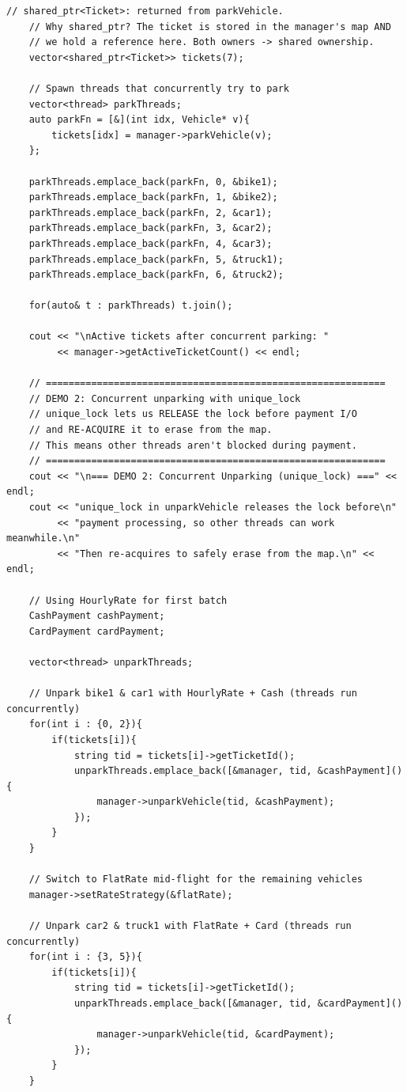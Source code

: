 \documentclass[11pt,a4paper]{article}
\begin{document}
\begin{lstlisting}[title={\texttt{main.cpp}}]
    // shared_ptr<Ticket>: returned from parkVehicle.
    // Why shared_ptr? The ticket is stored in the manager's map AND
    // we hold a reference here. Both owners -> shared ownership.
    vector<shared_ptr<Ticket>> tickets(7);

    // Spawn threads that concurrently try to park
    vector<thread> parkThreads;
    auto parkFn = [&](int idx, Vehicle* v){
        tickets[idx] = manager->parkVehicle(v);
    };

    parkThreads.emplace_back(parkFn, 0, &bike1);
    parkThreads.emplace_back(parkFn, 1, &bike2);
    parkThreads.emplace_back(parkFn, 2, &car1);
    parkThreads.emplace_back(parkFn, 3, &car2);
    parkThreads.emplace_back(parkFn, 4, &car3);
    parkThreads.emplace_back(parkFn, 5, &truck1);
    parkThreads.emplace_back(parkFn, 6, &truck2);

    for(auto& t : parkThreads) t.join();

    cout << "\nActive tickets after concurrent parking: "
         << manager->getActiveTicketCount() << endl;

    // ============================================================
    // DEMO 2: Concurrent unparking with unique_lock
    // unique_lock lets us RELEASE the lock before payment I/O
    // and RE-ACQUIRE it to erase from the map.
    // This means other threads aren't blocked during payment.
    // ============================================================
    cout << "\n=== DEMO 2: Concurrent Unparking (unique_lock) ===" << endl;
    cout << "unique_lock in unparkVehicle releases the lock before\n"
         << "payment processing, so other threads can work meanwhile.\n"
         << "Then re-acquires to safely erase from the map.\n" << endl;

    // Using HourlyRate for first batch
    CashPayment cashPayment;
    CardPayment cardPayment;

    vector<thread> unparkThreads;

    // Unpark bike1 & car1 with HourlyRate + Cash (threads run concurrently)
    for(int i : {0, 2}){
        if(tickets[i]){
            string tid = tickets[i]->getTicketId();
            unparkThreads.emplace_back([&manager, tid, &cashPayment](){
                manager->unparkVehicle(tid, &cashPayment);
            });
        }
    }

    // Switch to FlatRate mid-flight for the remaining vehicles
    manager->setRateStrategy(&flatRate);

    // Unpark car2 & truck1 with FlatRate + Card (threads run concurrently)
    for(int i : {3, 5}){
        if(tickets[i]){
            string tid = tickets[i]->getTicketId();
            unparkThreads.emplace_back([&manager, tid, &cardPayment](){
                manager->unparkVehicle(tid, &cardPayment);
            });
        }
    }


\end{lstlisting}
\end{document}
